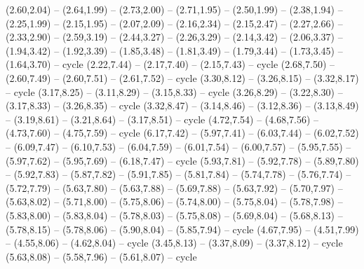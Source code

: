 {(2.60,2.04) -- (2.64,1.99) -- (2.73,2.00) -- (2.71,1.95) -- (2.50,1.99) -- (2.38,1.94) -- (2.25,1.99) -- (2.15,1.95) -- (2.07,2.09) -- (2.16,2.34) -- (2.15,2.47) -- (2.27,2.66) -- (2.33,2.90) -- (2.59,3.19) -- (2.44,3.27) -- (2.26,3.29) -- (2.14,3.42) -- (2.06,3.37) -- (1.94,3.42) -- (1.92,3.39) -- (1.85,3.48) -- (1.81,3.49) -- (1.79,3.44) -- (1.73,3.45) -- (1.64,3.70) -- cycle
  (2.22,7.44) -- (2.17,7.40) -- (2.15,7.43) -- cycle
  (2.68,7.50) -- (2.60,7.49) -- (2.60,7.51) -- (2.61,7.52) -- cycle
  (3.30,8.12) -- (3.26,8.15) -- (3.32,8.17) -- cycle
  (3.17,8.25) -- (3.11,8.29) -- (3.15,8.33) -- cycle
  (3.26,8.29) -- (3.22,8.30) -- (3.17,8.33) -- (3.26,8.35) -- cycle
  (3.32,8.47) -- (3.14,8.46) -- (3.12,8.36) -- (3.13,8.49) -- (3.19,8.61) -- (3.21,8.64) -- (3.17,8.51) -- cycle
  (4.72,7.54) -- (4.68,7.56) -- (4.73,7.60) -- (4.75,7.59) -- cycle
  (6.17,7.42) -- (5.97,7.41) -- (6.03,7.44) -- (6.02,7.52) -- (6.09,7.47) -- (6.10,7.53) -- (6.04,7.59) -- (6.01,7.54) -- (6.00,7.57) -- (5.95,7.55) -- (5.97,7.62) -- (5.95,7.69) -- (6.18,7.47) -- cycle
  (5.93,7.81) -- (5.92,7.78) -- (5.89,7.80) -- (5.92,7.83) -- (5.87,7.82) -- (5.91,7.85) -- (5.81,7.84) -- (5.74,7.78) -- (5.76,7.74) -- (5.72,7.79) -- (5.63,7.80) -- (5.63,7.88) -- (5.69,7.88) -- (5.63,7.92) -- (5.70,7.97) -- (5.63,8.02) -- (5.71,8.00) -- (5.75,8.06) -- (5.74,8.00) -- (5.75,8.04) -- (5.78,7.98) -- (5.83,8.00) -- (5.83,8.04) -- (5.78,8.03) -- (5.75,8.08) -- (5.69,8.04) -- (5.68,8.13) -- (5.78,8.15) -- (5.78,8.06) -- (5.90,8.04) -- (5.85,7.94) -- cycle
  (4.67,7.95) -- (4.51,7.99) -- (4.55,8.06) -- (4.62,8.04) -- cycle
  (3.45,8.13) -- (3.37,8.09) -- (3.37,8.12) -- cycle
  (5.63,8.08) -- (5.58,7.96) -- (5.61,8.07) -- cycle}
